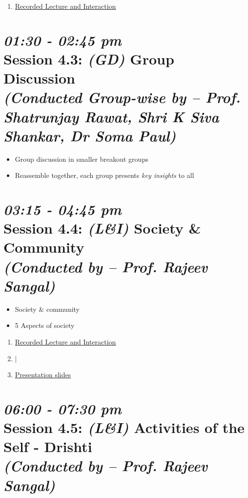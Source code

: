 \documentclass[11pt]{article}
\begin{document}
    \begin{enumerate}
        \item \href{https://www.youtube.com/watch?v=NDqjsn1o-LY}{Recorded Lecture and Interaction}
    \end{enumerate}

    \section*{{\it 01:30 - 02:45 pm} \\
    Session 4.3: {\it (GD)} Group Discussion \\
    {\Large\it (Conducted Group-wise by -- Prof. Shatrunjay Rawat, Shri K Siva Shankar, Dr Soma Paul)}}

    \begin{itemize}
        \item Group discussion in smaller breakout groups
        \item Reassemble together, each group presents {\em key insights} to all
    \end{itemize}


    \section*{{\it 03:15 - 04:45 pm} \\
    Session 4.4: {\it (L\&I)} Society \& Community \\
    {\Large\it (Conducted by -- Prof. Rajeev Sangal)}}

    \begin{itemize}
        \item Society \& community
        \item 5 Aspects of society
    \end{itemize}

    \begin{enumerate}
        \item \href{https://www.youtube.com/watch?v=ia-ZejlXSOk}{Recorded Lecture and Interaction}
        \item |
        \item \href{presentations/day4/harmony_in_society.pdf}{Presentation slides}
    \end{enumerate}


    \section*{{\it 06:00 - 07:30 pm} \\
    Session 4.5: {\it  (L\&I)} Activities of the Self - Drishti \\
    {\Large\it (Conducted by -- Prof. Rajeev Sangal)}}
\end{document}
